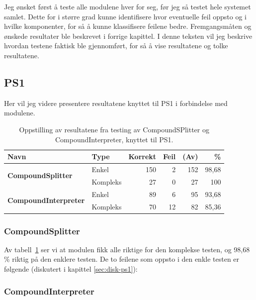 Jeg ønsket først å teste alle modulene hver for seg, før jeg så testet hele systemet samlet. Dette for i større grad kunne identifisere hvor eventuelle feil oppsto og i hvilke komponenter, for så å kunne klassifisere feilene bedre. Fremgangsmåten og ønskede resultater ble beskrevet i forrige kapittel. I denne teksten vil jeg beskrive hvordan testene faktisk ble gjennomført, for så å vise resultatene og tolke resultatene.

\subsection{PS1}

Her vil jeg videre presentere resultatene knyttet til PS1 i forbindelse med modulene.

\begin{table}[h]
	\centering 
	\begin{tabular}{llrrrr} \hline 
		\textbf{Navn} & \textbf{Type} & \textbf{Korrekt} & \textbf{Feil} & \textbf{(Av)} & \textbf{\%} \\
		\hline \multirow{2}{*}{\textbf{CompoundSplitter}} & Enkel & 150 & 2 & 152 & 98,68 \\
		\cline{2-6} & Kompleks & 27 & 0 & 27 & 100 \\
		\hline \multirow{2}{*}{\textbf{CompoundInterpreter}} & Enkel & 89 & 6 & 95 & 93,68 \\
		\cline{2-6} & Kompleks & 70 & 12 & 82 & 85,36 \\
		\hline 
	\end{tabular}
	\caption[Oppstilling av testresultater av moduler]{Oppstilling av resultatene fra testing av CompoundSPlitter og CompoundInterpreter, knyttet til PS1.} \label{tab:module-test} 
\end{table}

\subsubsection{CompoundSplitter}

Av tabell~\ref{tab:module-test} ser vi at modulen fikk alle riktige for den komplekse testen, og 98,68 \% riktig på den enklere testen. De to feilene som oppsto i den enkle testen er følgende (diskutert i kapittel \ref{sec:disk-ps1}):

\newline
{}

\subsubsection{CompoundInterpreter}

